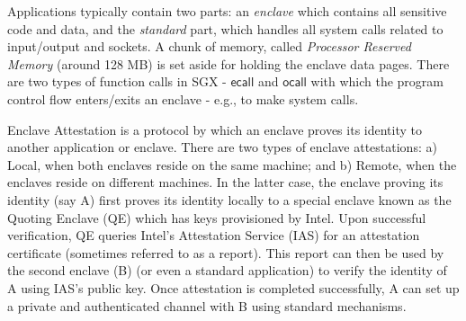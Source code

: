 Applications typically contain two parts: an {\em enclave} which contains all sensitive code and data, and the {\em standard} part, which handles all system calls related to input/output and sockets. A chunk of memory, called {\em Processor Reserved Memory} (around 128 MB) is set aside for holding the enclave data pages. There are two types of function calls in SGX - $\mathsf{ecall}$ and $\mathsf{ocall}$ with which the program control flow enters/exits an enclave - e.g., to make system calls. 

Enclave Attestation is a protocol by which an enclave proves its identity to another application or enclave. There are two types of enclave attestations: a) Local, when both enclaves reside on the same machine; and b) Remote, when the enclaves reside on different machines. In the latter case, the enclave proving its identity (say A) first proves its identity locally to a special enclave known as the Quoting Enclave (QE) which has keys provisioned by Intel. Upon successful verification, QE queries Intel's Attestation Service (IAS) for an attestation certificate (sometimes referred to as a report). This report can then be used by the second enclave (B) (or even a standard application) to verify the identity of A using IAS's public key. Once attestation is completed successfully, A can set up a private and authenticated channel with B using standard mechanisms.
